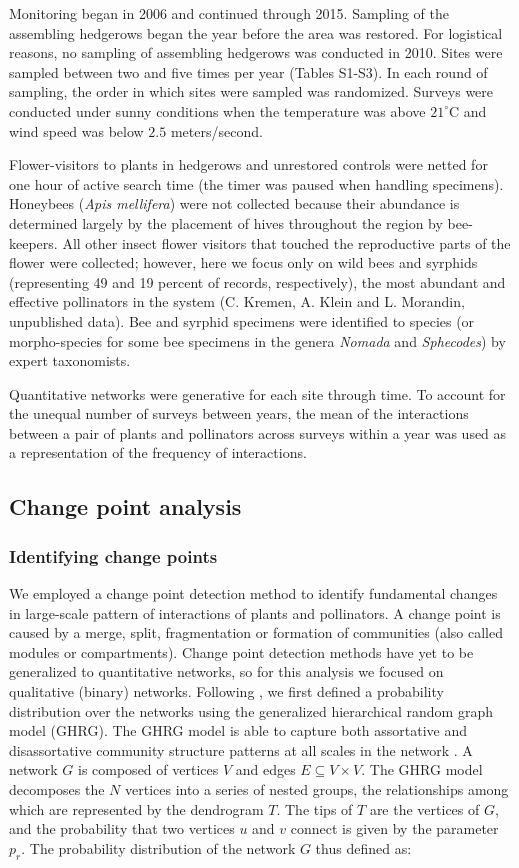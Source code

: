 \documentclass[12pt]{article}
\begin{document}
Monitoring began in 2006 and continued through 2015. Sampling of the
assembling hedgerows began the year before the area was restored. For
logistical reasons, no sampling of assembling hedgerows was conducted
in 2010. Sites were sampled between two and five times per year
(Tables S1-S3). In each round of
sampling, the order in which sites were sampled was
randomized. Surveys were conducted under sunny conditions when the
temperature was above $21^{\circ}\mathrm{C}$ and wind speed was below
$2.5$ meters/second.

Flower-visitors to plants in hedgerows and unrestored controls were
netted for one hour of active search time (the timer was paused when
handling specimens). Honeybees (\textit{Apis mellifera}) were not
collected because their abundance is determined largely by the
placement of hives throughout the region by bee-keepers. All other
insect flower visitors that touched the reproductive parts of the
flower were collected; however, here we focus only on wild bees and
syrphids (representing 49 and 19 percent of records, respectively),
the most abundant and effective pollinators in the system (C. Kremen,
A. Klein and L. Morandin, unpublished data). Bee and syrphid specimens
were identified to species (or morpho-species for some bee specimens
in the genera \textit{Nomada} and \textit{Sphecodes}) by expert
taxonomists.

Quantitative networks were generative for each site through time. To
account for the unequal number of surveys between years, the mean of
the interactions between a pair of plants and pollinators across
surveys within a year was used as a representation of the frequency of
interactions.

\subsection*{Change point analysis}
\subsubsection*{Identifying change points}
We employed a change point detection method \citep{peel2014detecting}
to identify fundamental changes in large-scale pattern of interactions
of plants and pollinators. A change point is caused by a merge, split,
fragmentation or formation of communities (also called modules or
compartments). Change point detection methods have yet to be
generalized to quantitative networks, so for this analysis we focused
on qualitative (binary) networks. Following \cite{peel2014detecting},
we first defined a probability distribution over the networks using
the generalized hierarchical random graph model (GHRG). The GHRG model
is able to capture both assortative and disassortative community
structure patterns at all scales in the network
\citep{peel2014detecting}. A network $G$ is composed of vertices $V$
and edges $E \subseteq {V × V }$. The GHRG model decomposes the $N$
vertices into a series of nested groups, the relationships among which
are represented by the dendrogram $T$. The tips of $T$ are the
vertices of $G$, and the probability that two vertices $u$ and $v$
connect is given by the parameter $p_r$. The probability distribution
of the network $G$ thus defined as:
\end{document}

